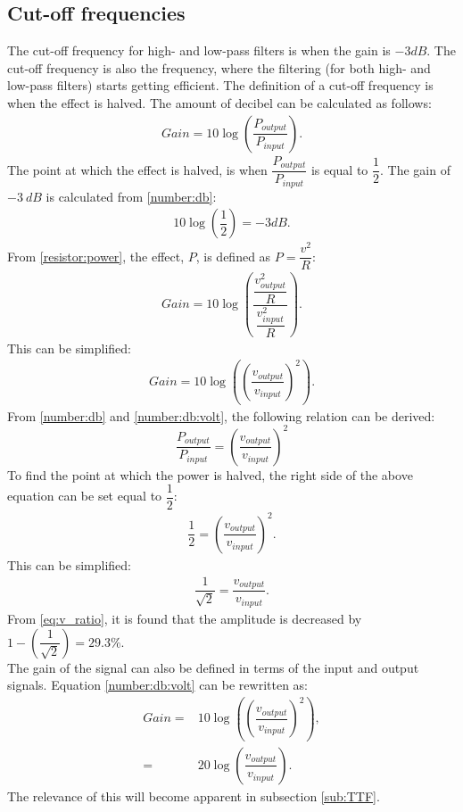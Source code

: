 \subsection{Cut-off frequencies}
The cut-off frequency for high- and low-pass filters is when the gain is $-3dB$. The cut-off frequency is also the frequency, where the filtering (for both high- and low-pass filters) starts getting efficient. The definition of a cut-off frequency is when the effect is halved. The amount of decibel can be calculated as follows: \cite[p. 596-597]{bcircuit}
\begin{align} \label{number:db}
Gain = 10 \log \left(\dfrac{P_{output}}{P_{input}} \right).
\end{align}
The point at which the effect is halved, is when $\dfrac{P_{output}}{P_{input}}$ is equal to $\dfrac{1}{2}$. The gain of $-3\ dB$ is calculated from \eqref{number:db}:
\begin{align*} 
10 \log \left(\dfrac{1}{2} \right) = -3 dB.
\end{align*}
From \eqref{resistor:power}, the effect, $P$, is defined as $P=\dfrac{v^2}{R}$:
\begin{align*}
Gain = 10 \log \left(\dfrac{\dfrac{v_{output}^2}{R}}{\dfrac{v_{input}^2}{R}} \right).
\end{align*}
This can be simplified:
\begin{align} \label{number:db:volt}
Gain = 10 \log \left(\left(\dfrac{v_{output}}{v_{input}} \right)^2\right).
\end{align}
From \eqref{number:db} and \eqref{number:db:volt}, the following relation can be derived: $$\dfrac{P_{output}}{P_{input}}= \left(\dfrac{v_{output}}{v_{input}} \right)^2$$ To find the point at which the power is halved, the right side of the above equation can be set equal to $\dfrac{1}{2}$:
\begin{align*}
\dfrac{1}{2}= \left(\dfrac{v_{output}}{v_{input}} \right)^2.
\end{align*}
This can be simplified:
\begin{align} \label{eq:v_ratio}
\dfrac{1}{\sqrt{2}}= \dfrac{v_{output}}{v_{input}}.
\end{align}
From \eqref{eq:v_ratio}, it is found that the amplitude is decreased by $1-\left(\dfrac{1}{\sqrt{2}} \right) = 29.3\%$. 
\\
The gain of the signal can also be defined in terms of the input and output signals. Equation \eqref{number:db:volt} can be rewritten as:
\begin{align*}
	Gain =& 10 \log \left(\left(\dfrac{v_{output}}{v_{input}} \right)^2\right),
	\\
	     =& 20 \log \left(\dfrac{v_{output}}{v_{input}} \right).
\end{align*}
The relevance of this will become apparent in subsection \ref{sub:TTF}.

